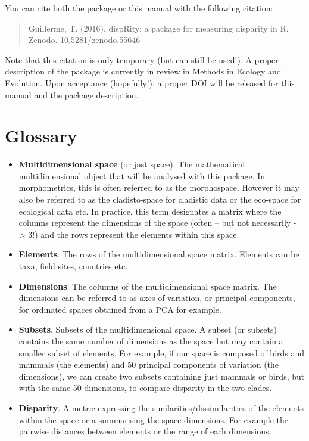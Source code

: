 \documentclass[]{book}
\theoremstyle{definition}
\theoremstyle{definition}
\theoremstyle{remark}
\begin{document}
You can cite both the package or this manual with the following
citation:

\begin{quote}
Guillerme, T. (2016). dispRity: a package for measuring disparity in R.
Zenodo. 10.5281/zenodo.55646
\end{quote}

Note that this citation is only temporary (but can still be used!). A
proper description of the package is currently in review in Methods in
Ecology and Evolution. Upon acceptance (hopefully!), a proper DOI will
be released for this manual and the package description.

\chapter{Glossary}\label{glossary}

\begin{itemize}
\item
  \textbf{Multidimensional space} (or just space). The mathematical
  multidimensional object that will be analysed with this package. In
  morphometrics, this is often referred to as the morphospace. However
  it may also be referred to as the cladisto-space for cladistic data or
  the eco-space for ecological data etc. In practice, this term
  designates a matrix where the columns represent the dimensions of the
  space (often -- but not necessarily - \textgreater{} 3!) and the rows
  represent the elements within this space.
\item
  \textbf{Elements}. The rows of the multidimensional space matrix.
  Elements can be taxa, field sites, countries etc.
\item
  \textbf{Dimensions}. The columns of the multidimensional space matrix.
  The dimensions can be referred to as axes of variation, or principal
  components, for ordinated spaces obtained from a PCA for example.
\item
  \textbf{Subsets}. Subsets of the multidimensional space. A subset (or
  subsets) contains the same number of dimensions as the space but may
  contain a smaller subset of elements. For example, if our space is
  composed of birds and mammals (the elements) and 50 principal
  components of variation (the dimensions), we can create two subsets
  containing just mammals or birds, but with the same 50 dimensions, to
  compare disparity in the two clades.
\item
  \textbf{Disparity}. A metric expressing the
  similarities/dissimilarities of the elements within the space or a
  summarising the space dimensions. For example the pairwise distances
  between elements or the range of each dimensions.
\end{itemize}
\end{document}
